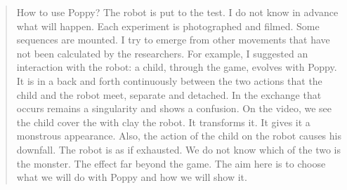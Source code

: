 \begin{quotation}
    How to use Poppy? The robot is put to the test. I do not know in advance what will happen. Each experiment is photographed and filmed. Some sequences are mounted. I try to emerge from other movements that have not been calculated by the researchers. For example, I suggested an interaction with the robot: a child, through the game, evolves with Poppy. It is in a back and forth continuously between the two actions that the child and the robot meet, separate and detached. In the exchange that occurs remains a singularity and shows a confusion. On the video, we see the child cover the with clay the robot. It transforms it. It gives it a monstrous appearance. Also, the action of the child on the robot causes his downfall. The robot is as if exhausted. We do not know which of the two is the monster. The effect far beyond the game. The aim here is to choose what we will do with Poppy and how we will show it.
\end{quotation}











